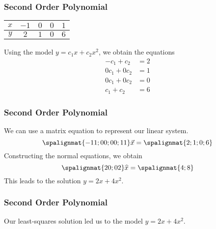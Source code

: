\begin{frame}\frametitle{Second Order Polynomial}

    \begin{center}
        \begin{tabular}{c|cccc} 
            $ x$  & $-1$ & $0$ & $0$ & $1$
            \\ \hline 
            $ y$ & $2$ & $1$ & $0$ & $6$
        \end{tabular}
    \end{center}
    
    Using the model  $y = c_1 x + c_2 x^2$, we obtain the equations
    \begin{align*}
        -c_1 +c_2 &= 2 \\
        0c_1 + 0c_2 &= 1 \\
        0c_1 + 0c_2 &= 0 \\
        c_1 + c_2 &= 6
    \end{align*}
    
\end{frame}



\begin{frame}\frametitle{Second Order Polynomial}
    
    \pause 
    We can use a matrix equation to represent our linear system. 
    $$\spalignmat{-1 1;0 0;0 0;1 1}\vec x = \spalignmat{2;1;0;6}$$
    \pause 
    Constructing the normal equations, we obtain
    \pause 
    $$\spalignmat{2 0;0 2}\widehat x = \spalignmat{4;8}$$
    \pause
    This leads to the solution $y= 2x + 4x^2$. 
    
\end{frame}



\begin{frame}\frametitle{Second Order Polynomial}  

    Our least-squares solution led us to the model $y= 2x + 4x^2$. 
    \begin{center}
    

    \end{center} 
    
\end{frame}







